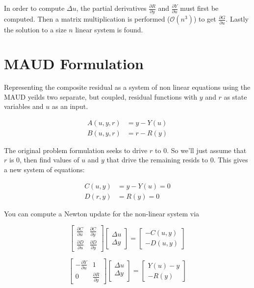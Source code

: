 \documentclass[12pt]{article}
\begin{document}
In order to compute $\Delta u$, the partial derivatives
$\frac{\partial R}{\partial y}$ and  $\frac{\partial Y}{\partial u}$ must first be computed.
Then a matrix multiplication is performed ($\mathcal{O}(n^3)$) to get $\frac{\partial G}{\partial u}$.
Lastly the solution to a size $n$ linear system is found.

\section{MAUD Formulation}

Representing the composite residual as a system of non linear equations using the MAUD yeilds
two separate, but coupled, residual functions with $y$ and $r$ as state variables
and $u$ as an input.

\begin{align}
  A(u,y,r) & = y - Y(u) \label{MAUD_y} \\
  B(u,y,r) & = r - R(y) \label{MAUD_r}
  \label{maud1}
\end{align}

The original problem formulation seeks to drive $r$ to 0. So we'll just assume
that $r$ is 0, then find values of $u$ and $y$ that drive
the remaining resids to 0. This gives a new system of equations:

\begin{align}
  C(u,y) & = y - Y(u) = 0 \label{y_resid} \\
  D(r,y) & = R(y) = 0 \label{r_resid}
  \label{maud2}
\end{align}

You can compute a Newton update for the non-linear system via

\begin{equation}
  \begin{bmatrix}
    \frac{\partial C}{\partial u} & \frac{\partial C}{\partial y} \\
    \frac{\partial D}{\partial u} & \frac{\partial D}{\partial y}
  \end{bmatrix}
  \begin{bmatrix}
    \Delta u \\
    \Delta y
  \end{bmatrix}
  =
  \begin{bmatrix}
    -C(u,y) \\
    -D(u,y)
  \end{bmatrix}
\end{equation}

\begin{equation}
  \begin{bmatrix}
    -\frac{\partial Y}{\partial u} & 1 \\
    0 & \frac{\partial R}{\partial y}
  \end{bmatrix}
  \begin{bmatrix}
    \Delta u \\
    \Delta y \\
  \end{bmatrix}
  =
  \begin{bmatrix}
    Y(u) - y \\
    - R(y)
  \end{bmatrix}
\end{equation}
\end{document}
